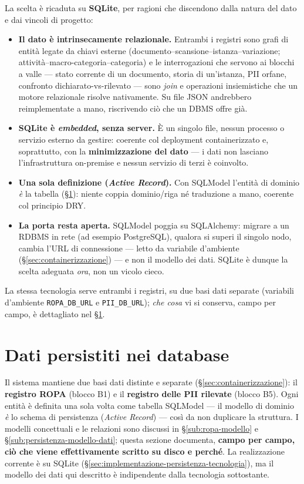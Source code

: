 La scelta è ricaduta su \textbf{SQLite}, per ragioni che discendono dalla natura del dato e dai vincoli di progetto:
\begin{itemize}
	\item \textbf{Il dato è intrinsecamente relazionale.} Entrambi i registri sono grafi di entità legate da chiavi esterne (documento--scansione--istanza--variazione; attività--macro-categoria--categoria) e le interrogazioni che servono ai blocchi a valle --- stato corrente di un documento, storia di un'istanza, PII orfane, confronto dichiarato-vs-rilevato --- sono \textit{join} e operazioni insiemistiche che un motore relazionale risolve nativamente. Su file JSON andrebbero reimplementate a mano, riscrivendo ciò che un DBMS offre già.
	\item \textbf{SQLite è \emph{embedded}, senza server.} È un singolo file, nessun processo o servizio esterno da gestire: coerente col deployment containerizzato e, soprattutto, con la \textbf{minimizzazione del dato} --- i dati non lasciano l'infrastruttura on-premise e nessun servizio di terzi è coinvolto.
	\item \textbf{Una sola definizione (\textit{Active Record}).} Con SQLModel l'entità di dominio \emph{è} la tabella (§\ref{sec:dati-persistiti}): niente coppia dominio/riga né traduzione a mano, coerente col principio DRY.
	\item \textbf{La porta resta aperta.} SQLModel poggia su SQLAlchemy: migrare a un RDBMS in rete (ad esempio PostgreSQL), qualora si superi il singolo nodo, cambia l'URL di connessione --- letto da variabile d'ambiente (§\ref{sec:containerizzazione}) --- e non il modello dei dati. SQLite è dunque la scelta adeguata \emph{ora}, non un vicolo cieco.
\end{itemize}

La stessa tecnologia serve entrambi i registri, su due basi dati separate (variabili d'ambiente \texttt{ROPA\_DB\_URL} e \texttt{PII\_DB\_URL}); \emph{che cosa} vi si conserva, campo per campo, è dettagliato nel §\ref{sec:dati-persistiti}.

\section{Dati persistiti nei database}
\label{sec:dati-persistiti}

Il sistema mantiene due basi dati distinte e separate (§\ref{sec:containerizzazione}): il \textbf{registro ROPA} (blocco B1) e il \textbf{registro delle PII rilevate} (blocco B5). Ogni entità è definita una sola volta come tabella SQLModel --- il modello di dominio \emph{è} lo schema di persistenza (\textit{Active Record}) --- così da non duplicare la struttura. I modelli concettuali e le relazioni sono discussi in §\ref{sub:ropa-modello} e §\ref{sub:persistenza-modello-dati}; questa sezione documenta, \textbf{campo per campo, ciò che viene effettivamente scritto su disco e perché}. La realizzazione corrente è su SQLite (§\ref{sec:implementazione-persistenza-tecnologia}), ma il modello dei dati qui descritto è indipendente dalla tecnologia sottostante.

